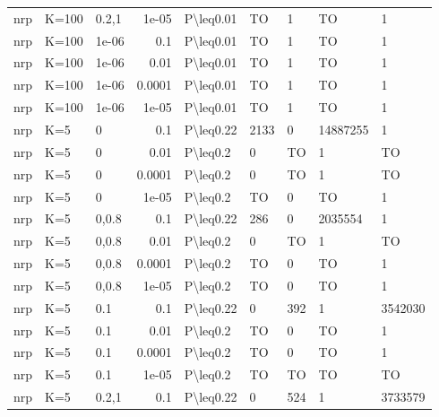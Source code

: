\begin{longtable}{lllrlllll}
 nrp           & K=100     & 0.2,1 & 1e-05  & P\textbackslash{}leq0.01  & TO   & 1    & TO       & 1       \\
 nrp           & K=100     & 1e-06 & 0.1    & P\textbackslash{}leq0.01  & TO   & 1    & TO       & 1       \\
 nrp           & K=100     & 1e-06 & 0.01   & P\textbackslash{}leq0.01  & TO   & 1    & TO       & 1       \\
 nrp           & K=100     & 1e-06 & 0.0001 & P\textbackslash{}leq0.01  & TO   & 1    & TO       & 1       \\
 nrp           & K=100     & 1e-06 & 1e-05  & P\textbackslash{}leq0.01  & TO   & 1    & TO       & 1       \\
 nrp           & K=5       & 0     & 0.1    & P\textbackslash{}leq0.22  & 2133 & 0    & 14887255 & 1       \\
 nrp           & K=5       & 0     & 0.01   & P\textbackslash{}leq0.2   & 0    & TO   & 1        & TO      \\
 nrp           & K=5       & 0     & 0.0001 & P\textbackslash{}leq0.2   & 0    & TO   & 1        & TO      \\
 nrp           & K=5       & 0     & 1e-05  & P\textbackslash{}leq0.2   & TO   & 0    & TO       & 1       \\
 nrp           & K=5       & 0,0.8 & 0.1    & P\textbackslash{}leq0.22  & 286  & 0    & 2035554  & 1       \\
 nrp           & K=5       & 0,0.8 & 0.01   & P\textbackslash{}leq0.2   & 0    & TO   & 1        & TO      \\
 nrp           & K=5       & 0,0.8 & 0.0001 & P\textbackslash{}leq0.2   & TO   & 0    & TO       & 1       \\
 nrp           & K=5       & 0,0.8 & 1e-05  & P\textbackslash{}leq0.2   & TO   & 0    & TO       & 1       \\
 nrp           & K=5       & 0.1   & 0.1    & P\textbackslash{}leq0.22  & 0    & 392  & 1        & 3542030 \\
 nrp           & K=5       & 0.1   & 0.01   & P\textbackslash{}leq0.2   & TO   & 0    & TO       & 1       \\
 nrp           & K=5       & 0.1   & 0.0001 & P\textbackslash{}leq0.2   & TO   & 0    & TO       & 1       \\
 nrp           & K=5       & 0.1   & 1e-05  & P\textbackslash{}leq0.2   & TO   & TO   & TO       & TO      \\
 nrp           & K=5       & 0.2,1 & 0.1    & P\textbackslash{}leq0.22  & 0    & 524  & 1        & 3733579 \\

\end{longtable}
